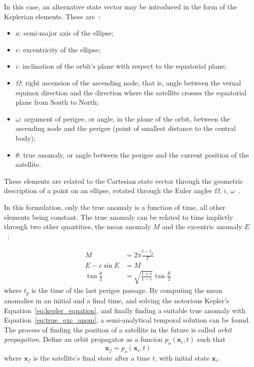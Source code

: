 In this case, an alternative state vector may be introduced in the form of the Keplerian elements. These are~\cite{curtis2015orbital}:
\begin{itemize}
    \item \(a\): semi-major axis of the ellipse;
    \item \(e\): excentricity of the ellipse;
    \item \(i\): inclination of the orbit's plane with respect to the equatorial plane;
    \item \(\Omega \): right ascension of the ascending node, that is, angle between the vernal equinox direction and the direction where the satellite crosses the equatorial plane from South to North;
    \item \(\omega \): argument of perigee, or angle, in the plane of the orbit, between the ascending node and the perigee (point of smallest distance to the central body);
    \item \(\theta \): true anomaly, or angle between the perigee and the current position of the satellite.
\end{itemize}

These elements are related to the Cartesian state vector through the geometric description of a point on an ellipse, rotated through the Euler angles \(\Omega\), \(i\), \(\omega\)~\cite{curtis2015orbital}.


In this formulation, only the true anomaly is a function of time, all other elements being constant. The true anomaly can be related to time implictly through two other quantities, the mean anomaly \(M\) and the excentric anomaly \(E\)~\cite{curtis2015orbital}:

\begin{align} 
        M &= 2\pi \frac{t - t_p}{T} \\
        E - e \sin{E} &= M \label{eq:kepler_equation}\\
        \tan{\frac{\theta}{2}} &= \sqrt{\frac{1+e}{1-e}} \tan{\frac{E}{2}} \label{eq:true_exc_anom}
\end{align}
where \(t_p\) is the time of the last perigee passage. By computing the mean anomalies in an initial and a final time, and solving the notorious Kepler's Equation~\eqref{eq:kepler_equation}, and finally finding a suitable true anomaly with Equation~\eqref{eq:true_exc_anom}, a semi-analytical temporal solution can be found. The process of finding the position of a satellite in the future is called \textit{orbit propagation}. Define an orbit propagator as a funcion \(p_o(\mathbf{x}_i, t)\) such that
\begin{equation} \label{eq:orbit_propagator}
    \mathbf{x}_f = p_o(\mathbf{x}_i, t)
\end{equation}
where \(\mathbf{x}_f\) is the satellite's final state after a time \(t\), with initial state \(\mathbf{x}_i\).

